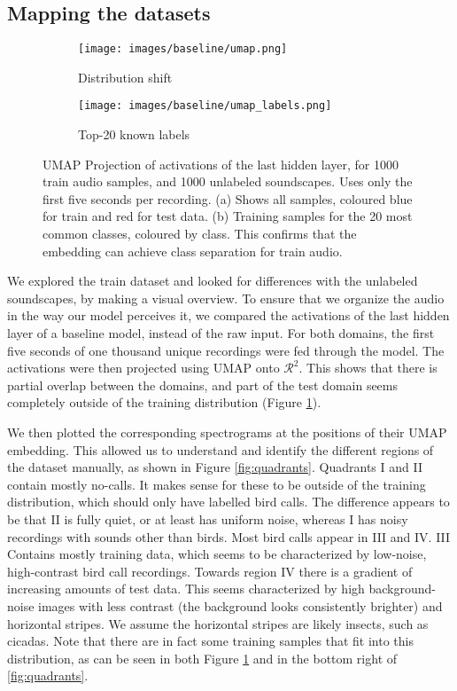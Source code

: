 \subsection{Mapping the datasets}
\begin{figure}[htbp]
    \centering
    \begin{subfigure}[b]{0.49\textwidth}
        \centering
        \texttt{[image: images/baseline/umap.png]}
        \caption{Distribution shift}
        \label{fig:umap:shift}
    \end{subfigure}
    \hfill
    \begin{subfigure}[b]{0.49\textwidth}
        \centering
        \texttt{[image: images/baseline/umap\_labels.png]}
        \caption{Top-20 known labels}
        \label{fig:umap:cls}
    \end{subfigure}
    \caption{UMAP Projection of activations of the last hidden layer, for 1000 train audio samples, and 1000 unlabeled soundscapes. Uses only the first five seconds per recording. (a) Shows all samples, coloured blue for train and red for test data. (b) Training samples for the 20 most common classes, coloured by class. This confirms that the embedding can achieve class separation for train audio.}
    \label{fig:umap}
\end{figure}
We explored the train dataset and looked for differences with the unlabeled soundscapes, by making a visual overview. To ensure that we organize the audio in the way our model perceives it, we compared the activations of the last hidden layer of a baseline model, instead of the raw input. For both domains, the first five seconds of one thousand unique recordings were fed through the model. The activations were then projected using UMAP\cite{umap} onto $\mathcal{R}^2$. This shows that there is partial overlap between the domains, and part of the test domain seems completely outside of the training distribution (Figure \ref{fig:umap:shift}). 

We then plotted the corresponding spectrograms at the positions of their UMAP embedding. This allowed us to understand and identify the different regions of the dataset manually, as shown in Figure \ref{fig:quadrants}. Quadrants I and II contain mostly no-calls. It makes sense for these to be outside of the training distribution, which should only have labelled bird calls. The difference appears to be that II is fully quiet, or at least has uniform noise, whereas I has noisy recordings with sounds other than birds. Most bird calls appear in  III and IV. III Contains mostly training data, which seems to be characterized by low-noise, high-contrast bird call recordings. Towards region IV there is a gradient of increasing amounts of test data. This seems characterized by high background-noise images with less contrast (the background looks consistently brighter) and horizontal stripes. We assume the horizontal stripes are likely insects, such as cicadas. Note that there are in fact some training samples that fit into this distribution, as can be seen in both Figure \ref{fig:umap:shift} and in the bottom right of \ref{fig:quadrants}.

